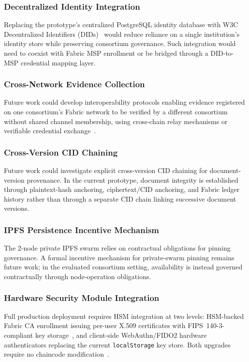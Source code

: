 \documentclass{ieeeaccess}
\begin{document}
\subsubsection{Decentralized Identity Integration}
Replacing the prototype's centralized PostgreSQL identity database
with W3C Decentralized Identifiers (DIDs)~\cite{sporny2023did}
would reduce reliance on a single institution's identity store while
preserving consortium governance. Such integration would need to
coexist with Fabric MSP enrollment or be bridged through a DID-to-MSP
credential mapping layer.

\subsubsection{Cross-Network Evidence Collection}
Future work could develop interoperability protocols enabling evidence
registered on one consortium's Fabric network to be verified by a
different consortium without shared channel membership, using
cross-chain relay mechanisms or verifiable credential
exchange~\cite{sporny2022vc}.

\subsubsection{Cross-Version CID Chaining}
Future work could investigate explicit cross-version CID chaining for document-version provenance. In the current prototype, document integrity is established through plaintext-hash anchoring, ciphertext/CID anchoring, and Fabric ledger history rather than through a separate CID chain linking successive document versions.


\subsubsection{IPFS Persistence Incentive Mechanism}
The 2-node private IPFS swarm relies on contractual obligations for
pinning governance. A formal incentive mechanism for private-swarm
pinning remains future work; in the evaluated consortium setting,
availability is instead governed contractually through node-operation
obligations.

\subsubsection{Hardware Security Module Integration}
Full production deployment requires HSM integration at two levels:
HSM-backed Fabric CA enrollment issuing per-user X.509 certificates
with FIPS~140-3-compliant key storage~\cite{fips1403,fabricCADoc},
and client-side WebAuthn/FIDO2 hardware authenticators replacing the
current \texttt{localStorage} key store. Both upgrades require no
chaincode modification~\cite{nist800634,w3cWebAuthnL3,nist800131a}.
\end{document}
